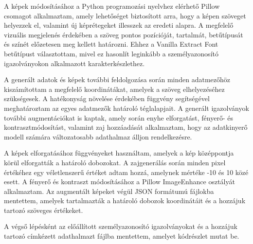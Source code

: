 \documentclass[
]{thesis-ekf}
\theoremstyle{definition}
\theoremstyle{remark}
\begin{document}
A képek módosításához a Python programozási nyelvhez elérhető Pillow csomagot alkalmaztam, amely lehetőséget biztosított arra, hogy a képen szöveget helyezzek el, valamint új képrétegeket illesszek az eredeti alapra. A megfelelő vizuális megjelenés érdekében a szöveg pontos pozícióját, tartalmát, betűtípusát és színét előzetesen meg kellett határozni. Ehhez a Vanilla Extract Font betűtípust választottam, mivel ez hasonlít leginkább a személyazonosító igazolványokon alkalmazott karakterkészlethez.

A generált adatok és képek további feldolgozása során minden adatmezőhöz kiszámítottam a megfelelő koordinátákat, amelyek a szöveg elhelyezéséhez szükségesek. A hatékonyság növelése érdekében függvény segítségével meghatároztam az egyes adatmezők határoló téglalapjait. A generált igazolványok további augmentációkat is kaptak, amely során enyhe elforgatást, fényerő- és kontrasztmódosítást, valamint zaj hozzáadását alkalmaztam, hogy az adatkinyerő modell számára változatosabb adathalmaz álljon rendelkezésre.

A képek elforgatásához függvényeket használtam, amelyek a kép középpontja körül elforgatták a határoló dobozokat. A zajgenerálás során minden pixel értékéhez egy véletlenszerű értéket adtam hozzá, amelynek mértéke -10 és 10 közé esett. A fényerő és kontraszt módosításához a Pillow ImageEnhance osztályát alkalmaztam. Az augmentált képeket végül JSON formátumú fájlokba mentettem, amelyek tartalmazták a határoló dobozok koordinátáit és a hozzájuk tartozó szöveges értékeket.

A végső lépésként az előállított személyazonosító igazolványokat és a hozzájuk tartozó címkézett adathalmazt fájlba mentettem, amelyet  kódrészlet mutat be.
\end{document}
